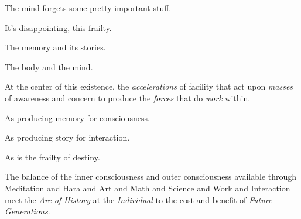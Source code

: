 

The mind forgets some pretty important stuff.

It's disappointing, this frailty.

The memory and its stories.

The body and the mind.

At the center of this existence, the {\it accelerations} of facility
that act upon {\it masses} of awareness and concern to produce the
{\it forces} that do {\it work} within.

As producing memory for consciousness.

As producing story for interaction.

As is the frailty of destiny.

The balance of the inner consciousness and outer consciousness
available through Meditation and Hara and Art and Math and Science and
Work and Interaction meet the {\it Arc of History} at the {\it
Individual} to the cost and benefit of {\it Future Generations}.

\bye
